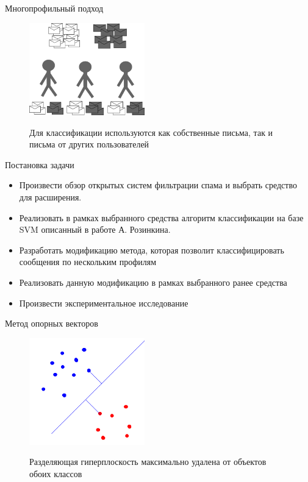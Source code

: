 \documentclass{beamer}
\begin{document}
\begin{frame}{Многопрофильный подход}
\begin{figure}[h]
\begin{center}
    \includegraphics[width=5cm]{img/multiprofile}
\end{center}
    Для классификации используются как собственные письма, так и письма от других пользователей
\end{figure}
\end{frame}
\begin{frame}{Постановка задачи}
\begin{itemize}
	\item Произвести обзор открытых систем фильтрации спама и выбрать средство для расширения.
    \item Реализовать в рамках выбранного средства алгоритм классификации на базе SVM описанный в работе А. Розинкина. 
    \item Разработать модификацию метода, которая позволит классифицировать сообщения по нескольким профилям
	\item Реализовать данную модификацию в рамках выбранного ранее средства
    \item Произвести экспериментальное исследование
\end{itemize}
\end{frame}

\begin{frame}{Метод опорных векторов}
\begin{figure}[h]
\begin{center}
    \includegraphics[width=5cm]{../img/svm}
\end{center}
    Разделяющая гиперплоскость максимально удалена от объектов обоих классов
\end{figure}
\end{frame}
\end{document}
